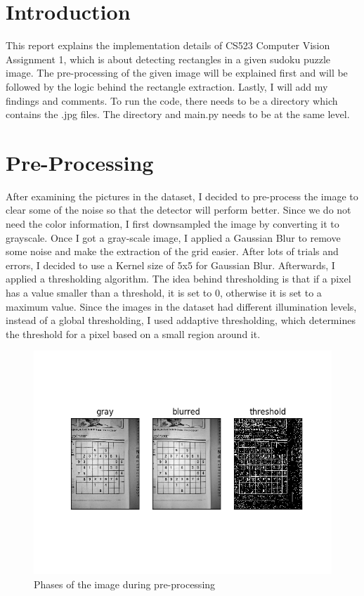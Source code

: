 \section*{Introduction}

This report explains the implementation details of CS523 Computer Vision Assignment 1, which is about detecting rectangles in a given sudoku puzzle image. The pre-processing of the given image will be explained first and will be followed by the logic behind the rectangle extraction. Lastly, I will add my findings and comments. To run the code, there needs to be a directory which contains the .jpg files. The directory and main.py needs to be at the same level. 


\section*{Pre-Processing}

After examining the pictures in the dataset, I decided to pre-process the image to clear some of the noise so that the detector will perform better. Since we do not need the color information, I first downsampled the image by converting it to grayscale. Once I got a gray-scale image, I applied a Gaussian Blur to remove some noise and make the extraction of the grid easier. After lots of trials and errors, I decided to use a Kernel size of 5x5 for Gaussian Blur. Afterwards, I applied a
thresholding algorithm. The idea behind thresholding is that if a pixel has a value smaller than a threshold, it is set to 0, otherwise it is set to a maximum value. Since the images in the dataset had different illumination levels, instead of a global thresholding, I used addaptive thresholding, which determines the threshold for a pixel based on a small region around it.

\begin{figure}[H]
    \centering
    \includegraphics[width=\textwidth]{images/preprocess.png}
    \caption{Phases of the image during pre-processing}
    \setlength{\belowcaptionskip}{-20pt}
    \setlength{\abovecaptionskip}{-20pt}
\end{figure}


